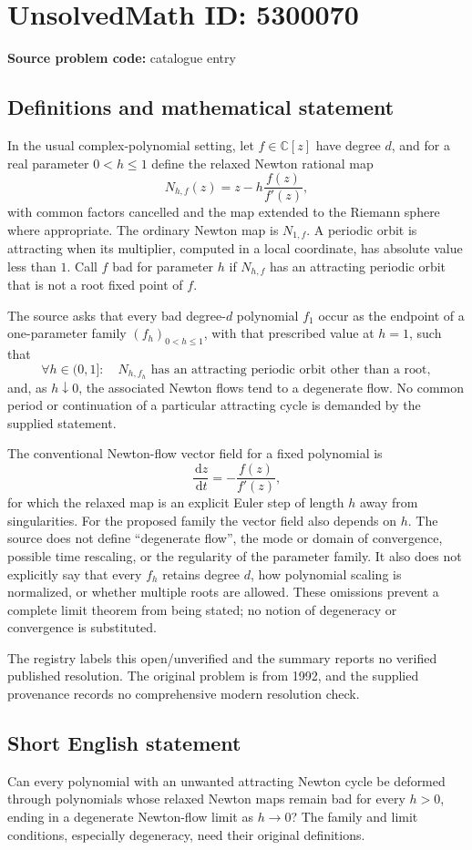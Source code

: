 \documentclass[11pt]{article}
\newcommand{\dd}{\,\mathrm{d}}
\begin{document}
\section*{UnsolvedMath ID: 5300070}
\textbf{Source problem code:} catalogue entry
\subsection{Definitions and mathematical statement}
In the usual complex-polynomial setting, let \(f\in\mathbb C[z]\) have degree \(d\), and for a real parameter \(0<h\le1\) define the relaxed Newton rational map
\[
 N_{h,f}(z)=z-h\frac{f(z)}{f'(z)},
\]
with common factors cancelled and the map extended to the Riemann sphere where appropriate. The ordinary Newton map is \(N_{1,f}\). A periodic orbit is attracting when its multiplier, computed in a local coordinate, has absolute value less than \(1\). Call \(f\) bad for parameter \(h\) if \(N_{h,f}\) has an attracting periodic orbit that is not a root fixed point of \(f\).

The source asks that every bad degree-\(d\) polynomial \(f_1\) occur as the endpoint of a one-parameter family \((f_h)_{0<h\le1}\), with that prescribed value at \(h=1\), such that
\[
 \forall h\in(0,1]:\quad
 N_{h,f_h}\text{ has an attracting periodic orbit other than a root},
\]
and, as \(h\downarrow0\), the associated Newton flows tend to a degenerate flow. No common period or continuation of a particular attracting cycle is demanded by the supplied statement.

The conventional Newton-flow vector field for a fixed polynomial is
\[
 \frac{\dd z}{\dd t}=-\frac{f(z)}{f'(z)},
\]
for which the relaxed map is an explicit Euler step of length \(h\) away from singularities. For the proposed family the vector field also depends on \(h\). The source does not define ``degenerate flow'', the mode or domain of convergence, possible time rescaling, or the regularity of the parameter family. It also does not explicitly say that every \(f_h\) retains degree \(d\), how polynomial scaling is normalized, or whether multiple roots are allowed. These omissions prevent a complete limit theorem from being stated; no notion of degeneracy or convergence is substituted.

The registry labels this open/unverified and the summary reports no verified published resolution. The original problem is from 1992, and the supplied provenance records no comprehensive modern resolution check.
\subsection{Short English statement}
Can every polynomial with an unwanted attracting Newton cycle be deformed through polynomials whose relaxed Newton maps remain bad for every \(h>0\), ending in a degenerate Newton-flow limit as \(h\to0\)? The family and limit conditions, especially degeneracy, need their original definitions.
\end{document}
